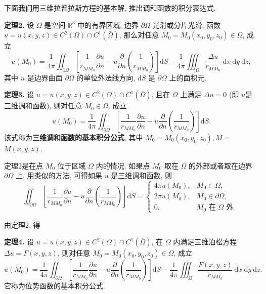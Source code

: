 下面我们用三维拉普拉斯方程的基本解, 推出调和函数的积分表达式.

\textbf{定理2.} 设 $ \Omega $ 是空间 $ \mathbb{R}^{3} $ 中的有界区域, 边界 $ \partial \Omega $ 光滑或分片光滑, 函数 $ u=u(x, y, z) \in C^{2}(\Omega) \cap C^{1}(\bar{\Omega}) $, 那么对任意 $ M_{0}=M_{0}\left(x_{0}, y_{0}, z_{0}\right) \in \Omega $, 成立
$$
u\left(M_{0}\right)=\frac{1}{4 \pi} \iint_{\partial \Omega}\left[\frac{1}{r_{M M_{0}}} \frac{\partial u}{\partial n}-u \frac{\partial}{\partial n}\left(\frac{1}{r_{M M_{0}}}\right)\right] \mathrm{d} S-\frac{1}{4 \pi} \iiint_{\Omega} \frac{\Delta u}{r_{M M_{0}}} \mathrm{~d} x \mathrm{~d} y \mathrm{~d} z,
$$
其中 $ n $ 是边界曲面 $ \partial \Omega $ 的单位外法线方向, $ \mathrm{d} S $ 是 $ \partial \Omega $ 上的面积元.

\textbf{定理3.} 设 $ u=u(x, y, z) \in C^{2}(\Omega) \cap C^{1}(\overline{\Omega}) $, 且在 $ \Omega $ 上满足 $ \Delta u=0 $ (即 $ u $是三维调和函数), 则对任意 $ M_{0} \in \Omega $, 成立
$$
u\left(M_{0}\right)=\frac{1}{4 \pi} \iint_{\partial \Omega}\left[\frac{1}{r_{M M_{0}}} \frac{\partial u}{\partial n}-u \frac{\partial}{\partial n}\left(\frac{1}{r_{M M_{0}}}\right)\right] \mathrm{d} S .
$$
该式称为\textbf{三维调和函数的基本积分公式}, 其中 $ M_{0}=M_{0}\left(x_{0}, y_{0}, z_{0}\right), M= $ $ M(x, y, z) $.

定理2是在点 $ M_{0} $ 位于区域 $ \Omega $ 内的情况. 如果点 $ M_{0} $ 取在 $ \Omega $ 的外部或者取在边界 $ \partial \Omega $ 上. 用类似的方法, 可得如果 $ u $ 是三维调和函数, 则
$$
\iint_{\partial \Omega}\left[\frac{1}{r_{M M_{0}}} \frac{\partial u}{\partial n}-u \frac{\partial}{\partial n}\left(\frac{1}{r_{M M_{0}}}\right)\right] \mathrm{d} S 
=\left\{\begin{array}{ll}
4 \pi u\left(M_{0}\right), & M_{0} \in \Omega, \\
2 \pi u\left(M_{0}\right), & M_{0} \in \partial \Omega, \\
0, & M_{0} \text { 在 } \Omega \text { 外. }
\end{array}\right.
$$

由定理2, 得

\textbf{定理4.} 设 $ u=u(x, y, z) \in C^{2}(\Omega) \cap C^{1}(\overline{\Omega}) $, 在 $ \Omega $ 内满足三维泊松方程 $ \Delta u=F(x, y, z) $, 则对任意 $ M_{0}=M_{0}\left(x_{0}, y_{0}, z_{0}\right) \in \Omega $, 成立
$$
u\left(M_{0}\right)=\frac{1}{4 \pi} \iint_{\partial \Omega}\left[\frac{1}{r_{M M_{0}}} \frac{\partial u}{\partial n}-u \frac{\partial}{\partial n}\left(\frac{1}{r_{M M_{0}}}\right)\right] \mathrm{d} S-\frac{1}{4 \pi} \iiint_{\Omega} \frac{F(x, y, z)}{r_{M M_{0}}} \mathrm{~d} x \mathrm{~d} y \mathrm{~d} z .
$$
它称为位势函数的基本积分公式.

